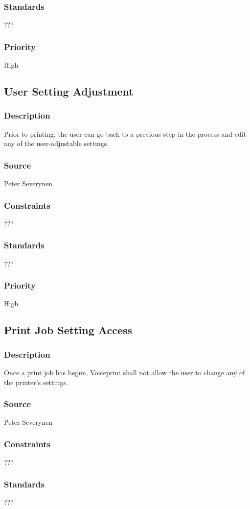 \subsubsection{Standards}
???
\subsubsection{Priority}
High
\subsection{User Setting Adjustment}
\subsubsection{Description}
Prior to printing, the user can go back to a previous step in the process and edit any of the user-adjustable settings.
\subsubsection{Source}
Peter Severynen
\subsubsection{Constraints}
???
\subsubsection{Standards}
???
\subsubsection{Priority}
High
\subsection{Print Job Setting Access}
\subsubsection{Description}
Once a print job has begun, Voiceprint shall not allow the user to change any of the printer's settings.
\subsubsection{Source}
Peter Severynen
\subsubsection{Constraints}
???
\subsubsection{Standards}
???
